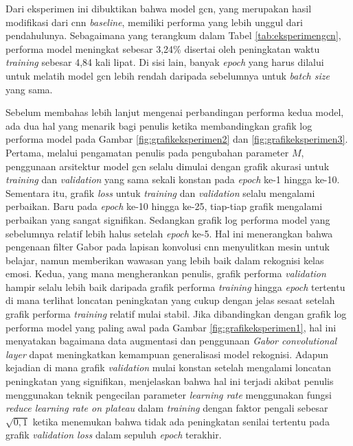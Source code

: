 Dari eksperimen ini dibuktikan bahwa model \acrshort{gcn}, yang merupakan hasil modifikasi dari \acrshort{cnn} \textit{baseline}, memiliki performa yang lebih unggul dari pendahulunya. Sebagaimana yang terangkum dalam Tabel \ref{tab:eksperimengcn}, performa model meningkat sebesar 3,24\% disertai oleh peningkatan waktu \textit{training} sebesar 4,84 kali lipat. Di sisi lain, banyak \textit{epoch} yang harus dilalui untuk melatih model \acrshort{gcn} lebih rendah daripada sebelumnya untuk \textit{batch size} yang sama.

Sebelum membahas lebih lanjut mengenai perbandingan performa kedua model, ada dua hal yang menarik bagi penulis ketika membandingkan grafik log performa model pada Gambar \ref{fig:grafikeksperimen2} dan \ref{fig:grafikeksperimen3}. Pertama, melalui pengamatan penulis pada pengubahan parameter $M$, penggunaan arsitektur model \acrshort{gcn} selalu dimulai dengan grafik akurasi untuk \textit{training} dan \textit{validation} yang sama sekali konstan pada \textit{epoch} ke-1 hingga ke-10. Sementara itu, grafik \textit{loss} untuk \textit{training} dan \textit{validation} selalu mengalami perbaikan. Baru pada \textit{epoch} ke-10 hingga ke-25, tiap-tiap grafik mengalami perbaikan yang sangat signifikan. Sedangkan grafik log performa model yang sebelumnya relatif lebih halus setelah \textit{epoch} ke-5. Hal ini menerangkan bahwa pengenaan filter Gabor pada lapisan konvolusi \acrshort{cnn} menyulitkan mesin untuk belajar, namun memberikan wawasan yang lebih baik dalam rekognisi kelas emosi. Kedua, yang mana mengherankan penulis, grafik performa \textit{validation} hampir selalu lebih baik daripada grafik performa \textit{training} hingga \textit{epoch} tertentu di mana terlihat loncatan peningkatan yang cukup dengan jelas sesaat setelah grafik performa \textit{training} relatif mulai stabil. Jika dibandingkan dengan grafik log performa model yang paling awal pada Gambar \ref{fig:grafikeksperimen1}, hal ini menyatakan bagaimana data augmentasi dan penggunaan \textit{Gabor convolutional layer} dapat meningkatkan kemampuan generalisasi model rekognisi. Adapun kejadian di mana grafik \textit{validation} mulai konstan setelah mengalami loncatan peningkatan yang signifikan, menjelaskan bahwa hal ini terjadi akibat penulis menggunakan teknik pengecilan parameter \textit{learning rate} menggunakan fungsi \textit{reduce learning rate on plateau} dalam \textit{training} dengan faktor pengali sebesar $\sqrt{0,1}$ ketika menemukan bahwa tidak ada peningkatan senilai tertentu pada grafik \textit{validation loss} dalam sepuluh \textit{epoch} terakhir.

